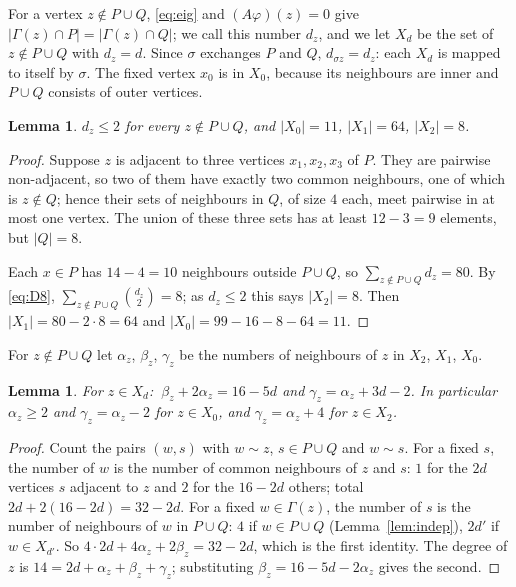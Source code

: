 \documentclass[11pt,a4paper]{article}
\newtheorem{lemma}[theorem]{Lemma}
\theoremstyle{remark}
\newcommand{\sg}{\sigma}
\newcommand{\Nb}{\Gamma}
\begin{document}
For a vertex $z\notin P\cup Q$, \eqref{eq:eig} and $(A\varphi)(z)=0$ give $|\Nb(z)\cap P|=|\Nb(z)\cap Q|$; we call
this number $d_z$, and we let $X_d$ be the set of $z\notin P\cup Q$ with $d_z=d$. Since $\sg$ exchanges $P$ and $Q$,
$d_{\sg z}=d_z$: each $X_d$ is mapped to itself by $\sg$. The fixed vertex $x_0$ is in $X_0$, because its neighbours
are inner and $P\cup Q$ consists of outer vertices.

\begin{lemma}\label{lem:X}
$d_z\le2$ for every $z\notin P\cup Q$, and $|X_0|=11$, $|X_1|=64$, $|X_2|=8$.
\end{lemma}
\begin{proof}
Suppose $z$ is adjacent to three vertices $x_1,x_2,x_3$ of $P$. They are pairwise non-adjacent, so two of them have
exactly two common neighbours, one of which is $z\notin Q$; hence their sets of neighbours in $Q$, of size $4$ each,
meet pairwise in at most one vertex. The union of these three sets has at least $12-3=9$ elements, but $|Q|=8$.

Each $x\in P$ has $14-4=10$ neighbours outside $P\cup Q$, so $\sum_{z\notin P\cup Q}d_z=80$. By \eqref{eq:D8},
$\sum_{z\notin P\cup Q}\binom{d_z}2=8$; as $d_z\le2$ this says $|X_2|=8$. Then $|X_1|=80-2\cdot8=64$ and
$|X_0|=99-16-8-64=11$.
\end{proof}

For $z\notin P\cup Q$ let $\alpha_z$, $\beta_z$, $\gamma_z$ be the numbers of neighbours of $z$ in $X_2$, $X_1$,
$X_0$.

\begin{lemma}\label{lem:abc}
For $z\in X_d$: $\ \beta_z+2\alpha_z=16-5d$ and $\gamma_z=\alpha_z+3d-2$. In particular $\alpha_z\ge2$ and
$\gamma_z=\alpha_z-2$ for $z\in X_0$, and $\gamma_z=\alpha_z+4$ for $z\in X_2$.
\end{lemma}
\begin{proof}
Count the pairs $(w,s)$ with $w\sim z$, $s\in P\cup Q$ and $w\sim s$. For a fixed $s$, the number of $w$ is the
number of common neighbours of $z$ and $s$: $1$ for the $2d$ vertices $s$ adjacent to $z$ and $2$ for the
$16-2d$ others; total $2d+2(16-2d)=32-2d$. For a fixed $w\in\Nb(z)$, the number of $s$ is the number of neighbours of
$w$ in $P\cup Q$: $4$ if $w\in P\cup Q$ (Lemma~\ref{lem:indep}), $2d'$ if $w\in X_{d'}$. So
$4\cdot2d+4\alpha_z+2\beta_z=32-2d$, which is the first identity. The degree of $z$ is
$14=2d+\alpha_z+\beta_z+\gamma_z$; substituting $\beta_z=16-5d-2\alpha_z$ gives the second.
\end{proof}
\end{document}
